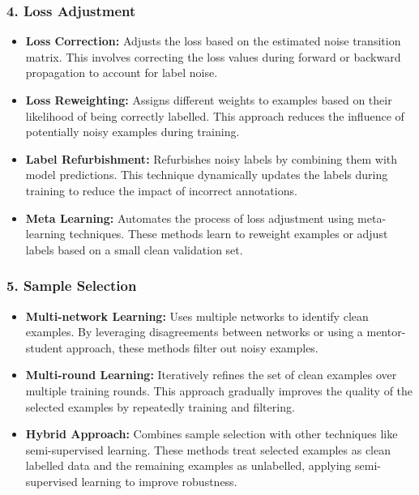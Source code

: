 \subsubsection*{4. Loss Adjustment}
\label{subsubsec:loss_adjust}
\begin{itemize}
    \item \textbf{Loss Correction:} Adjusts the loss based on the estimated noise transition matrix. This involves correcting the loss values during forward or backward propagation to account for label noise.
    \item \textbf{Loss Reweighting:} Assigns different weights to examples based on their likelihood of being correctly labelled. This approach reduces the influence of potentially noisy examples during training.
    \item \textbf{Label Refurbishment:} Refurbishes noisy labels by combining them with model predictions. This technique dynamically updates the labels during training to reduce the impact of incorrect annotations.
    \item \textbf{Meta Learning:} Automates the process of loss adjustment using meta-learning techniques. These methods learn to reweight examples or adjust labels based on a small clean validation set.
\end{itemize}

\subsubsection*{5. Sample Selection}
\begin{itemize}
    \item \textbf{Multi-network Learning:} Uses multiple networks to identify clean examples. By leveraging disagreements between networks or using a mentor-student approach, these methods filter out noisy examples.
    \item \textbf{Multi-round Learning:} Iteratively refines the set of clean examples over multiple training rounds. This approach gradually improves the quality of the selected examples by repeatedly training and filtering.
    \item \textbf{Hybrid Approach:} Combines sample selection with other techniques like semi-supervised learning. These methods treat selected examples as clean labelled data and the remaining examples as unlabelled, applying semi-supervised learning to improve robustness.
\end{itemize}

